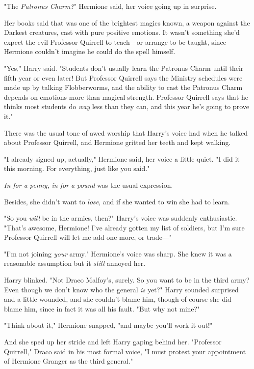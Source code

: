 "The \emph{Patronus Charm?}" Hermione said, her voice going up in surprise.

Her books said that was one of the brightest magics known, a weapon against the
Darkest creatures, cast with pure positive emotions. It wasn't something she'd
expect the evil Professor Quirrell to teach---or arrange to be taught, since
Hermione couldn't imagine he could do the spell himself.

"Yes," Harry said. "Students don't usually learn the Patronus Charm until their
fifth year or even later! But Professor Quirrell says the Ministry schedules
were made up by talking Flobberworms, and the ability to cast the Patronus
Charm depends on emotions more than magical strength. Professor Quirrell says
that he thinks most students do \emph{way} less than they can, and this year
he's going to prove it."

There was the usual tone of awed worship that Harry's voice had when he talked
about Professor Quirrell, and Hermione gritted her teeth and kept walking.

"I already signed up, actually," Hermione said, her voice a little quiet. "I
did it this morning. For everything, just like you said."

\emph{In for a penny, in for a pound} was the usual expression.

Besides, she didn't want to \emph{lose}, and if she wanted to win she had to
learn.

"So you \emph{will} be in the armies, then?" Harry's voice was suddenly
enthusiastic. "That's awesome, Hermione! I've already gotten my list of
soldiers, but I'm sure Professor Quirrell will let me add one more, or trade---"

"I'm not joining \emph{your} army." Hermione's voice was sharp. She knew it was
a reasonable assumption but it \emph{still} annoyed her.

Harry blinked. "Not Draco Malfoy's, surely. So you want to be in the third
army? Even though we don't know who the general \emph{is} yet?" Harry sounded
surprised and a little wounded, and she couldn't blame him, though of course
she did blame him, since in fact it was all his fault. "But why not mine?"

"Think about it," Hermione snapped, "and maybe you'll work it out!"

And she sped up her stride and left Harry gaping behind her.
\later
"Professor Quirrell," Draco said in his most formal voice, "I must protest your
appointment of Hermione Granger as the third general."

